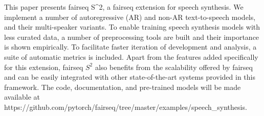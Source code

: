 This paper presents fairseq S^2, a fairseq extension for speech synthesis. We implement a number of autoregressive (AR) and non-AR text-to-speech models, and their multi-speaker variants. To enable training speech synthesis models with less curated data, a number of preprocessing tools are built and their importance is shown empirically. To facilitate faster iteration of development and analysis, a suite of automatic metrics is included. Apart from the features added specifically for this extension, fairseq $S^2$ also benefits from the scalability offered by fairseq and can be easily integrated with other state-of-the-art systems provided in this framework. The code, documentation, and pre-trained models will be made available at https://github.com/pytorch/fairseq/tree/master/examples/speech_synthesis.